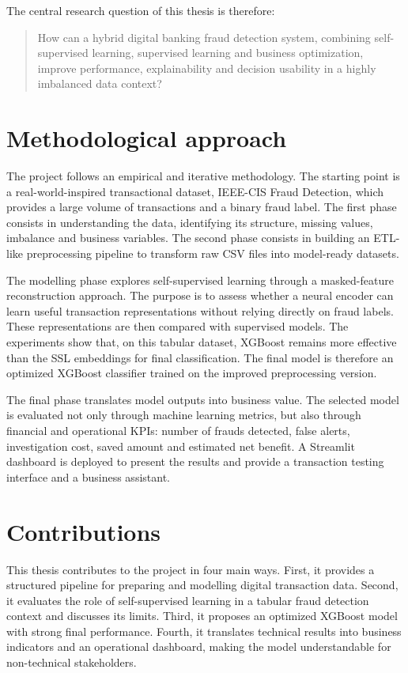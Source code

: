 ﻿\documentclass[12pt,a4paper,oneside]{report}
\begin{document}
The central research question of this thesis is therefore:

\begin{quote}
How can a hybrid digital banking fraud detection system, combining self-supervised learning, supervised learning and business optimization, improve performance, explainability and decision usability in a highly imbalanced data context?
\end{quote}

\section{Methodological approach}

The project follows an empirical and iterative methodology. The starting point is a real-world-inspired transactional dataset, IEEE-CIS Fraud Detection, which provides a large volume of transactions and a binary fraud label. The first phase consists in understanding the data, identifying its structure, missing values, imbalance and business variables. The second phase consists in building an ETL-like preprocessing pipeline to transform raw CSV files into model-ready datasets.

The modelling phase explores self-supervised learning through a masked-feature reconstruction approach. The purpose is to assess whether a neural encoder can learn useful transaction representations without relying directly on fraud labels. These representations are then compared with supervised models. The experiments show that, on this tabular dataset, XGBoost remains more effective than the SSL embeddings for final classification. The final model is therefore an optimized XGBoost classifier trained on the improved preprocessing version.

The final phase translates model outputs into business value. The selected model is evaluated not only through machine learning metrics, but also through financial and operational KPIs: number of frauds detected, false alerts, investigation cost, saved amount and estimated net benefit. A Streamlit dashboard is deployed to present the results and provide a transaction testing interface and a business assistant.

\section{Contributions}

This thesis contributes to the project in four main ways. First, it provides a structured pipeline for preparing and modelling digital transaction data. Second, it evaluates the role of self-supervised learning in a tabular fraud detection context and discusses its limits. Third, it proposes an optimized XGBoost model with strong final performance. Fourth, it translates technical results into business indicators and an operational dashboard, making the model understandable for non-technical stakeholders.
\end{document}
